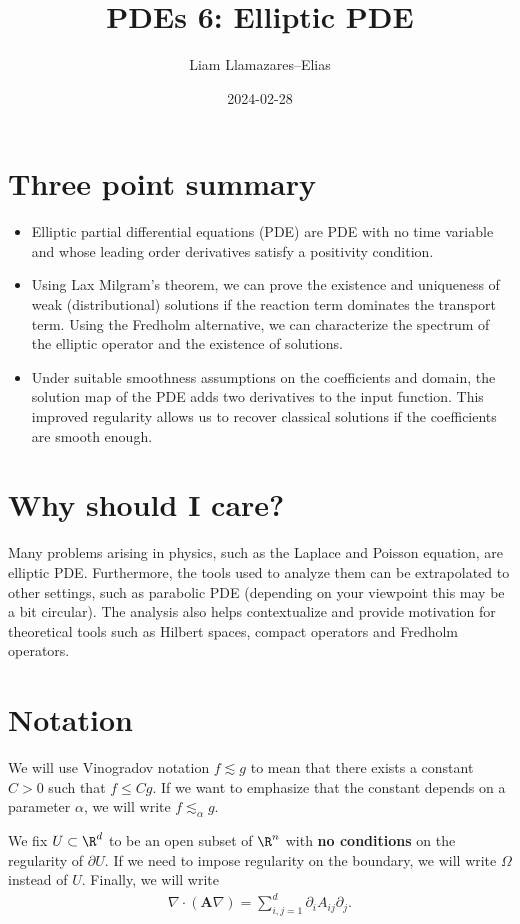 \documentclass[
    a4paper,
    DIV=14,
    abstract=true,
    numbers=noenddot
]{scrartcl}
\begin{document}
\title{PDEs 6: Elliptic PDE}
\author{Liam Llamazares--Elias}
\date{2024-02-28}
\maketitle
\section{ Three point summary}
\begin{itemize}
    \item Elliptic partial differential equations (PDE) are PDE with no time variable and whose leading order derivatives satisfy a positivity condition.
    \item Using Lax Milgram's theorem, we can prove the existence and uniqueness of weak (distributional) solutions if the reaction term dominates the transport term. Using the Fredholm alternative, we can characterize the spectrum of the elliptic operator and the existence of solutions.
    \item Under suitable smoothness assumptions on the coefficients and domain, the solution map of the PDE adds two derivatives to the input function. This improved regularity allows us to recover classical solutions if the coefficients are smooth enough.
\end{itemize}
\section{Why should I care?}
Many problems arising in physics, such as the Laplace and Poisson equation, are elliptic PDE. Furthermore, the tools used to analyze them can be extrapolated to other settings, such as
parabolic PDE (depending on your viewpoint this may be a bit circular). The analysis also helps contextualize and provide motivation for theoretical tools such as Hilbert spaces, compact operators and Fredholm operators.
\section{Notation}
We will use Vinogradov notation $f \lesssim g$ to mean that there exists a constant $C>0$ such that $f \leq Cg$. If we want to emphasize that the constant depends on a parameter $\alpha$, we will write $f \lesssim_\alpha g$.

We fix $U \subset \R^d$ to be an open subset of $\R^n$ with \textbf{no conditions} on the regularity of $\partial U$. If we need to impose regularity on the boundary, we will write $\Omega$ instead of $U$. Finally, we will write
\begin{align*}
    \nabla \cdot (\bm{A}\nabla)=\sum_{i,j=1}^d \partial_i A_{ij} \partial _j.
\end{align*}
\end{document}
